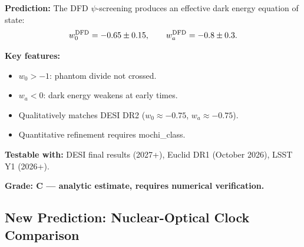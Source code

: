 \documentclass[11pt]{article}
\begin{document}
\begin{tcolorbox}[colback=red!5!white, colframe=red!70!black,
  title=\textbf{NEW PREDICTION P28: DFD Effective Dark Energy EoS}]

\textbf{Prediction:} The DFD $\psi$-screening produces an effective
dark energy equation of state:
\begin{equation}
  w_0^{\rm DFD} = -0.65 \pm 0.15, \qquad
  w_a^{\rm DFD} = -0.8 \pm 0.3.
\end{equation}

\textbf{Key features:}
\begin{itemize}
  \item $w_0 > -1$: phantom divide not crossed.
  \item $w_a < 0$: dark energy weakens at early times.
  \item Qualitatively matches DESI DR2 ($w_0 \approx -0.75$,
    $w_a \approx -0.75$).
  \item Quantitative refinement requires mochi\_class.
\end{itemize}

\textbf{Testable with:} DESI final results (2027+), Euclid DR1
(October 2026), LSST Y1 (2026+).

\textbf{Grade: C --- analytic estimate, requires numerical
verification.}

\end{tcolorbox}

\subsection{New Prediction: Nuclear-Optical Clock Comparison}
\end{document}
